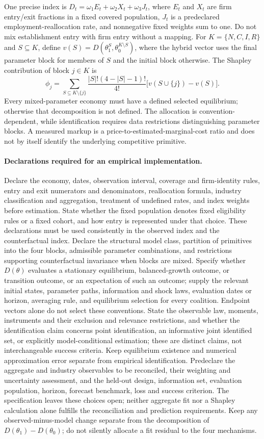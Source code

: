 \documentclass[11pt,a4paper]{article}
\begin{document}
One precise index is \(D_t=\omega_1 E_t+\omega_2 X_t+\omega_3J_t\), where \(E_t\) and \(X_t\) are firm entry/exit fractions in a fixed covered population, \(J_t\) is a predeclared employment-reallocation rate, and nonnegative fixed weights sum to one. Do not mix establishment entry with firm entry without a mapping. For \(K=\{N,C,I,R\}\) and \(S\subseteq K\), define \(v(S)=D(\theta_1^S,\theta_0^{K\setminus S})\), where the hybrid vector uses the final parameter block for members of \(S\) and the initial block otherwise. The Shapley contribution of block \(j\in K\) is
\[
 \phi_j=\sum_{S\subseteq K\setminus\{j\}}
 \frac{|S|!(4-|S|-1)!}{4!}\bigl[v(S\cup\{j\})-v(S)\bigr].
\] Every mixed-parameter economy must have a defined selected equilibrium; otherwise that decomposition is not defined. The allocation is convention-dependent, while identification requires data restrictions distinguishing parameter blocks. A measured markup is a price-to-estimated-marginal-cost ratio and does not by itself identify the underlying competitive primitive.

\paragraph{Declarations required for an empirical implementation.} Declare the economy, dates, observation interval, coverage and firm-identity rules, entry and exit numerators and denominators, reallocation formula, industry classification and aggregation, treatment of undefined rates, and index weights before estimation. State whether the fixed population denotes fixed eligibility rules or a fixed cohort, and how entry is represented under that choice. These declarations must be used consistently in the observed index and the counterfactual index. Declare the structural model class, partition of primitives into the four blocks, admissible parameter combinations, and restrictions supporting counterfactual invariance when blocks are mixed. Specify whether \(D(\theta)\) evaluates a stationary equilibrium, balanced-growth outcome, or transition outcome, or an expectation of such an outcome; supply the relevant initial states, parameter paths, information and shock laws, evaluation dates or horizon, averaging rule, and equilibrium selection for every coalition. Endpoint vectors alone do not select these conventions. State the observable law, moments, instruments and their exclusion and relevance restrictions, and whether the identification claim concerns point identification, an informative joint identified set, or explicitly model-conditional estimation; these are distinct claims, not interchangeable success criteria. Keep equilibrium existence and numerical approximation error separate from empirical identification. Predeclare the aggregate and industry observables to be reconciled, their weighting and uncertainty assessment, and the held-out design, information set, evaluation population, horizon, forecast benchmark, loss and success criterion. The specification leaves these choices open; neither aggregate fit nor a Shapley calculation alone fulfills the reconciliation and prediction requirements. Keep any observed-minus-model change separate from the decomposition of \(D(\theta_1)-D(\theta_0)\); do not silently allocate a fit residual to the four mechanisms.
\end{document}
